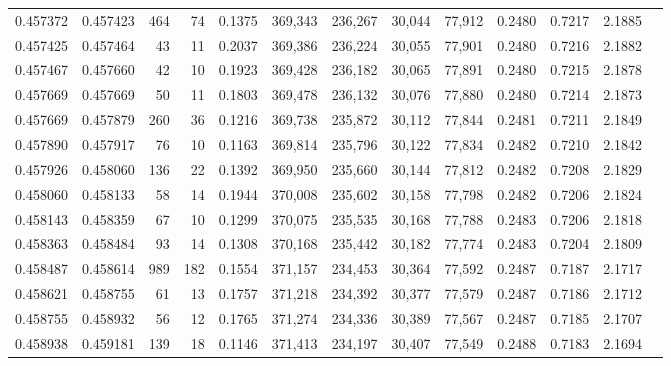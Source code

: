 \begin{tabular}{rrrrrrrrrrrrr}
0.457372 & 0.457423 &   464 &  74 &                                     0.1375 & 369,343 & 236,267 &  30,044 &  77,912 & 0.2480 & 0.7217 & 2.1885 \\
0.457425 & 0.457464 &    43 &  11 &                                     0.2037 & 369,386 & 236,224 &  30,055 &  77,901 & 0.2480 & 0.7216 & 2.1882 \\
0.457467 & 0.457660 &    42 &  10 &                                     0.1923 & 369,428 & 236,182 &  30,065 &  77,891 & 0.2480 & 0.7215 & 2.1878 \\
0.457669 & 0.457669 &    50 &  11 &                                     0.1803 & 369,478 & 236,132 &  30,076 &  77,880 & 0.2480 & 0.7214 & 2.1873 \\
0.457669 & 0.457879 &   260 &  36 &                                     0.1216 & 369,738 & 235,872 &  30,112 &  77,844 & 0.2481 & 0.7211 & 2.1849 \\
0.457890 & 0.457917 &    76 &  10 &                                     0.1163 & 369,814 & 235,796 &  30,122 &  77,834 & 0.2482 & 0.7210 & 2.1842 \\
0.457926 & 0.458060 &   136 &  22 &                                     0.1392 & 369,950 & 235,660 &  30,144 &  77,812 & 0.2482 & 0.7208 & 2.1829 \\
0.458060 & 0.458133 &    58 &  14 &                                     0.1944 & 370,008 & 235,602 &  30,158 &  77,798 & 0.2482 & 0.7206 & 2.1824 \\
0.458143 & 0.458359 &    67 &  10 &                                     0.1299 & 370,075 & 235,535 &  30,168 &  77,788 & 0.2483 & 0.7206 & 2.1818 \\
0.458363 & 0.458484 &    93 &  14 &                                     0.1308 & 370,168 & 235,442 &  30,182 &  77,774 & 0.2483 & 0.7204 & 2.1809 \\
0.458487 & 0.458614 &   989 & 182 &                                     0.1554 & 371,157 & 234,453 &  30,364 &  77,592 & 0.2487 & 0.7187 & 2.1717 \\
0.458621 & 0.458755 &    61 &  13 &                                     0.1757 & 371,218 & 234,392 &  30,377 &  77,579 & 0.2487 & 0.7186 & 2.1712 \\
0.458755 & 0.458932 &    56 &  12 &                                     0.1765 & 371,274 & 234,336 &  30,389 &  77,567 & 0.2487 & 0.7185 & 2.1707 \\
0.458938 & 0.459181 &   139 &  18 &                                     0.1146 & 371,413 & 234,197 &  30,407 &  77,549 & 0.2488 & 0.7183 & 2.1694 \\

\end{tabular}
